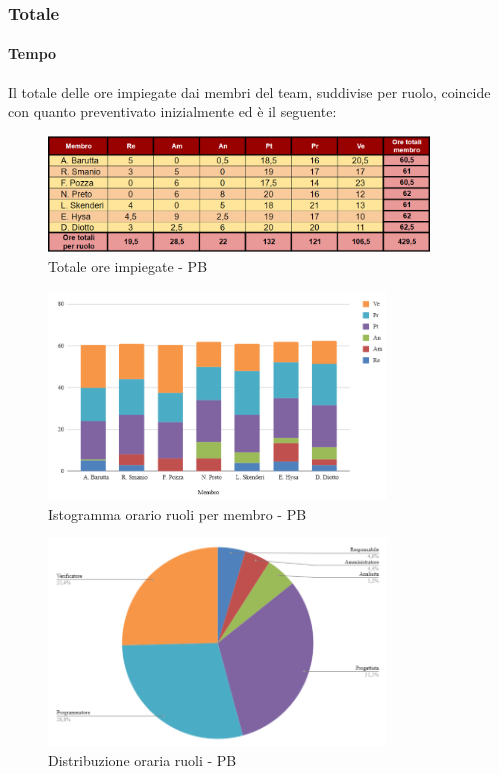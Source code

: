 \subsubsection{Totale}

\paragraph{Tempo}
Il totale delle ore impiegate dai membri del team, suddivise per ruolo, coincide con quanto preventivato inizialmente ed è il seguente:

\begin{figure}[H]
    \centering
    \includegraphics[width=0.9\textwidth]{../Images/riepilogoPBOreMembro.png}
    \caption{Totale ore impiegate - PB}
    \label{fig:Tot_orePB}
\end{figure}

\vspace{0.6cm}

\begin{figure}[H]
    \centering
    \includegraphics[width=0.8\textwidth]{../Images/graficoOrarioRuoloPB.png}
    \caption{Istogramma orario ruoli per membro - PB}
    \label{fig:GraficoOrePB}
\end{figure}

\begin{figure}[H]
    \centering
    \includegraphics[width=0.8\textwidth]{../Images/distribuzioneOrariaPBRuoli.png}
    \caption{Distribuzione oraria ruoli - PB}
    \label{fig:GraficoDistribuzioneOrePB}
\end{figure}

